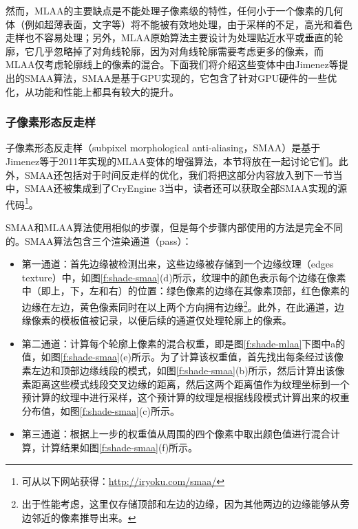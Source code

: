 然而，MLAA的主要缺点是不能处理子像素级的特性，任何小于一个像素的几何体（例如超薄表面，文字等）将不能被有效地处理，由于采样的不足，高光和着色走样也不容易处理；另外，MLAA原始算法主要设计为处理贴近水平或垂直的轮廓，它几乎忽略掉了对角线轮廓，因为对角线轮廓需要考虑更多的像素，而MLAA仅考虑轮廓线上的像素的混合。下面我们将介绍这些变体中由Jimenez等提出的SMAA算法，SMAA是基于GPU实现的，它包含了针对GPU硬件的一些优化，从功能和性能上都具有较大的提升。






\subsubsection{子像素形态反走样}
子像素形态反走样（subpixel morphological anti-aliasing，SMAA）\cite{a:SMAA:EnhancedSubpixelMorphologicalAntialiasing}是基于Jimenez等于2011年实现的MLAA\cite{a:PracticalMorphologicalAnti-Aliasing}变体的增强算法，本节将放在一起讨论它们。此外，SMAA还包括对于时间反走样的优化，我们将把这部分内容放入到下一节当中，SMAA还被集成到了CryEngine 3\cite{a:Anti-AliasingMethodsinCryENGINE3}当中，读者还可以获取全部SMAA实现的源代码\footnote{可从以下网站获得：\url{http://iryoku.com/smaa/}}。

SMAA和MLAA算法使用相似的步骤，但是每个步骤内部使用的方法是完全不同的。SMAA算法包含三个渲染通道（pass）：

\begin{itemize}
	\item 第一通道：首先边缘被检测出来，这些边缘被存储到一个边缘纹理（edges texture）中，如图\ref{f:shade-smaa}(d)所示，纹理中的颜色表示每个边缘在像素中（即上，下，左和右）的位置：绿色像素的边缘在其像素顶部，红色像素的边缘在左边，黄色像素同时在以上两个方向拥有边缘\footnote{出于性能考虑，这里仅存储顶部和左边的边缘，因为其他两边的边缘能够从旁边邻近的像素推导出来。}。此外，在此通道，边缘像素的模板值被记录，以便后续的通道仅处理轮廓上的像素。
	\item 第二通道：计算每个轮廓上像素的混合权重，即是图\ref{f:shade-mlaa}下图中a的值，如图\ref{f:shade-smaa}(e)所示。为了计算该权重值，首先找出每条经过该像素左边和顶部边缘线段的模式，如图\ref{f:shade-smaa}(b)所示，然后计算出该像素距离这些模式线段交叉边缘的距离，然后这两个距离值作为纹理坐标到一个预计算的纹理中进行采样，这个预计算的纹理是根据线段模式计算出来的权重分布值，如图\ref{f:shade-smaa}(c)所示。
	\item 第三通道：根据上一步的权重值从周围的四个像素中取出颜色值进行混合计算，计算结果如图\ref{f:shade-smaa}(f)所示。
\end{itemize}

